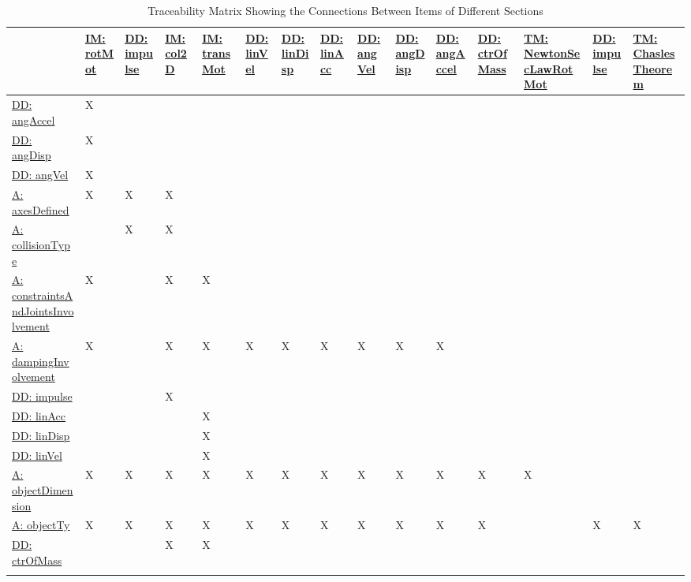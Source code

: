\documentclass[12pt]{article}
\begin{document}
\begin{longtable}{l l l l l l l l l l l l l l l}
\toprule
 & \hyperref[IM:rotMot]{IM: rotMot} & \hyperref[DD:impulse]{DD: impulse} & \hyperref[IM:col2D]{IM: col2D} & \hyperref[IM:transMot]{IM: transMot} & \hyperref[DD:linVel]{DD: linVel} & \hyperref[DD:linDisp]{DD: linDisp} & \hyperref[DD:linAcc]{DD: linAcc} & \hyperref[DD:angVel]{DD: angVel} & \hyperref[DD:angDisp]{DD: angDisp} & \hyperref[DD:angAccel]{DD: angAccel} & \hyperref[DD:ctrOfMass]{DD: ctrOfMass} & \hyperref[T:newtonSLR]{TM: NewtonSecLawRotMot} & \hyperref[DD:impulse]{DD: impulse} & \hyperref[T:chaslesThm]{TM: ChaslesTheorem}
\\
\midrule
\hyperref[DD:angAccel]{DD: angAccel} & X &  &  &  &  &  &  &  &  &  &  &  &  & 
\\
\hyperref[DD:angDisp]{DD: angDisp} & X &  &  &  &  &  &  &  &  &  &  &  &  & 
\\
\hyperref[DD:angVel]{DD: angVel} & X &  &  &  &  &  &  &  &  &  &  &  &  & 
\\
\hyperref[A:axesDefined]{A: axesDefined} & X & X & X &  &  &  &  &  &  &  &  &  &  & 
\\
\hyperref[A:collisionType]{A: collisionType} &  & X & X &  &  &  &  &  &  &  &  &  &  & 
\\
\hyperref[A:constraintsAndJointsInvolvement]{A: constraintsAndJointsInvolvement} & X &  & X & X &  &  &  &  &  &  &  &  &  & 
\\
\hyperref[A:dampingInvolvement]{A: dampingInvolvement} & X &  & X & X & X & X & X & X & X & X &  &  &  & 
\\
\hyperref[DD:impulse]{DD: impulse} &  &  & X &  &  &  &  &  &  &  &  &  &  & 
\\
\hyperref[DD:linAcc]{DD: linAcc} &  &  &  & X &  &  &  &  &  &  &  &  &  & 
\\
\hyperref[DD:linDisp]{DD: linDisp} &  &  &  & X &  &  &  &  &  &  &  &  &  & 
\\
\hyperref[DD:linVel]{DD: linVel} &  &  &  & X &  &  &  &  &  &  &  &  &  & 
\\
\hyperref[A:objectDimension]{A: objectDimension} & X & X & X & X & X & X & X & X & X & X & X & X &  & 
\\
\hyperref[A:objectTy]{A: objectTy} & X & X & X & X & X & X & X & X & X & X & X &  & X & X
\\
\hyperref[DD:ctrOfMass]{DD: ctrOfMass} &  &  & X & X &  &  &  &  &  &  &  &  &  & 
\\
\bottomrule
\caption{Traceability Matrix Showing the Connections Between Items of Different Sections}
\label{Table:Tracey}
\end{longtable}
\end{document}
